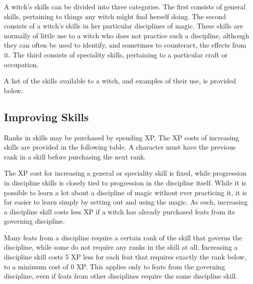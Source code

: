 A witch's skills can be divided into three categories.
The first consists of general skills, pertaining to things any witch might find herself doing.
The second consists of a witch's skills in her particular disciplines of magic.
These skills are normally of little use to a witch who does not practice such a discipline, although they can often be used to identify, and sometimes to counteract, the effects from it.
The third consists of speciality skills, pertaining to a particular craft or occupation.

A list of the skills available to a witch, and examples of their use, is provided below.

\subsection{Improving Skills}

Ranks in skills may be purchased by spending XP.
The XP costs of increasing skills are provided in the following table.
A character must have the previous rank in a skill before purchasing the next rank.


The XP cost for increasing a general or speciality skill is fixed, while progression in discipline skills is closely tied to progression in the discipline itself.
While it is possible to learn a lot about a discipline of magic without ever practicing it, it is far easier to learn simply by setting out and using the magic.
As such, increasing a discipline skill costs less XP if a witch has already purchased feats from its governing discipline.

Many feats from a discipline require a certain rank of the skill that governs the discipline, while some do not require any ranks in the skill at all.
Increasing a discipline skill costs 5 XP less for each feat that requires exactly the rank below, to a minimum cost of 0 XP.
This applies only to feats from the governing discipline, even if feats from other disciplines require the same discipline skill.


